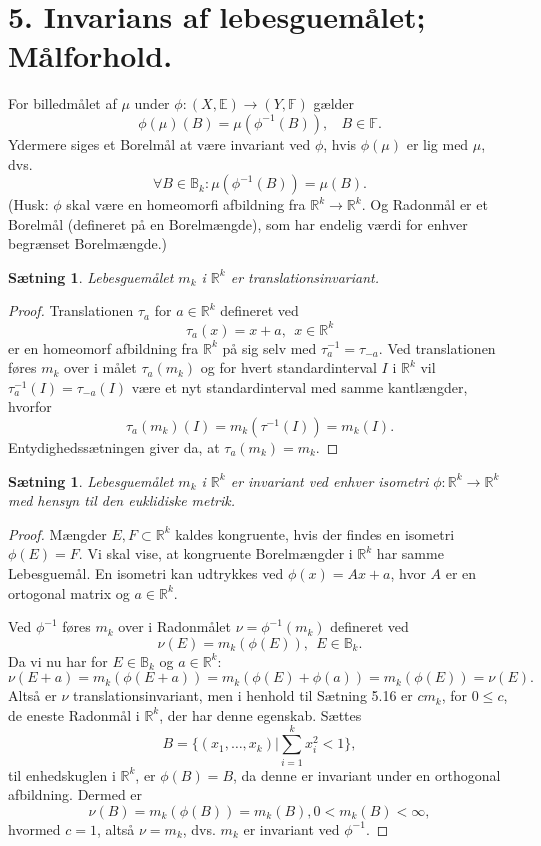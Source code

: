\documentclass[12pt]{report}
\newtheorem{theorem}[lemma]{Sætning}
\theoremstyle{break}
\newtheorem*{proof}{Bevis}
\theoremstyle{break}
\newcommand{\RR}{\mathbb{R}}
\newcommand{\EE}{\mathbb{E}}
\newcommand{\FF}{\mathbb{F}}
\begin{document}
\section*{5. Invarians af lebesguemålet; Målforhold.}
For billedmålet af $\mu$ under $\phi\colon(X,\EE)\to(Y,\FF)$ gælder
\[\phi(\mu)(B) = \mu(\phi^{-1}(B)),~~~~B\in\FF.\]
Ydermere siges et Borelmål at være invariant ved $\phi$, hvis $\phi(\mu)$ er lig med $\mu$, dvs.
\[\forall B\in\mathbb{B}_k\colon\mu(\phi^{-1}(B))=\mu(B).\]
(Husk: $\phi$ skal være en homeomorfi afbildning fra $\RR^k\to\RR^k$. Og Radonmål er et Borelmål (defineret på en Borelmængde), som har endelig værdi for enhver begrænset Borelmængde.)
\begin{theorem}
Lebesguemålet $m_k$ i $\RR^k$ er translationsinvariant.
\end{theorem}
\begin{proof}
Translationen $\tau_a$ for $a\in\RR^k$ defineret ved
\[\tau_a(x)=x+a,~~x\in\RR^k\]
er en homeomorf afbildning fra $\RR^k$ på sig selv med $\tau_a^{-1} = \tau_{-a}$. Ved translationen føres $m_k$ over i målet $\tau_a(m_k)$ og for hvert standardinterval $I$ i $\RR^k$ vil $\tau_a^{-1}(I) = \tau_{-a}(I)$ være et nyt standardinterval med samme kantlængder, hvorfor
\[\tau_a(m_k)(I)=m_k(\tau^{-1}(I))=m_k(I).\]
Entydighedssætningen giver da, at $\tau_a(m_k)=m_k$.
\end{proof}
\begin{theorem}
Lebesguemålet $m_k$ i $\RR^k$ er invariant ved enhver isometri $\phi\colon\RR^k\to\RR^k$ med hensyn til den euklidiske metrik.
\end{theorem}
\begin{proof}
Mængder $E,F\subset\RR^k$ kaldes kongruente, hvis der findes en isometri $\phi(E)=F$. Vi skal vise, at kongruente Borelmængder i $\RR^k$ har samme Lebesguemål. En isometri kan udtrykkes ved $\phi(x)=Ax+a$, hvor $A$ er en ortogonal matrix og $a\in\RR^k$.

\bigskip

Ved $\phi^{-1}$ føres $m_k$ over i Radonmålet $\nu=\phi^{-1}(m_k)$ defineret ved \[\nu(E)=m_k(\phi(E)),~~E\in\mathbb{B}_k.\]
Da vi nu har for $E\in\mathbb{B}_k$ og $a\in\RR^k$:
\[\nu(E+a)=m_k(\phi(E+a))=m_k(\phi(E)+\phi(a))=m_k(\phi(E))=\nu(E).\]
Altså er $\nu$ translationsinvariant, men i henhold til Sætning 5.16 er $cm_k$, for $0\leq c$, de eneste Radonmål i $\RR^k$, der har denne egenskab. Sættes
\[B=\{(x_1,\ldots,x_k)\vert\sum_{i=1}^kx_i^2<1\},\]
til enhedskuglen i $\RR^k$, er $\phi(B)=B$, da denne er invariant under en orthogonal afbildning. Dermed er
\[\nu(B)=m_k(\phi(B))=m_k(B), 0<m_k(B)<\infty,\]
hvormed $c=1$, altså $\nu=m_k$, dvs. $m_k$ er invariant ved $\phi^{-1}$.
\end{proof}
\end{document}
